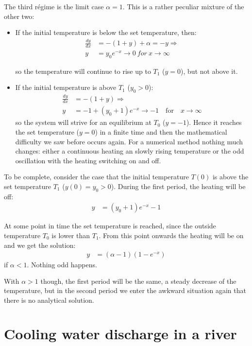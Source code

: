 \documentclass[onecolumn]{article}
\begin{document}
The third r\'egime is the limit case $\alpha = 1$. This is a rather peculiar mixture of the other two:
\begin{itemize}
\item
If the initial temperature is below the set temperature, then:
%
\begin{align}
    \frac{dy}{dx} &= -(1 + y) + \alpha = -y \Rightarrow \\
                y &= y_0 e^{-x} \rightarrow 0 ~for ~x \rightarrow \infty
\end{align}

\noindent so the temperature will continue to rise up to $T_1$ ($y = 0$), but not above it.
\item
If the initial temperature is above $T_1$ ($y_0 > 0$):
%
\begin{align}
    \frac{dy}{dx} &= -(1 + y)\Rightarrow \\
\nonumber       y &= -1 + (y_0 + 1) e^{-x} \rightarrow -1 \quad \text{for} \quad x \rightarrow \infty
\end{align}
\noindent so the system will strive for an equilibrium at $T_0$ ($y = -1$). Hence it reaches the
set temperature ($y = 0$) in a finite time and then the mathematical difficulty we saw before occurs
again. For a numerical method nothing much changes: either a continuous heating an slowly rising
temperature or the odd oscillation with the heating switching on and off.
\end{itemize}

To be complete, consider the case that the initial temperature $T(0)$ is above the set temperature $T_1$ ($y(0) = y_0 > 0$).
During the first period, the heating will be off:
%
\begin{align}
    y &= (y_0 + 1) e^{-x} - 1
\end{align}

At some point in time the set temperature is reached, since the outside temperature $T_0$ is lower than $T_1$.
From this point onwards the heating will be on and we get the solution:
%
\begin{align}
    y &= (\alpha - 1) (1 - e^{-x})
\end{align}
\noindent if $\alpha < 1$. Nothing odd happens.

With $\alpha > 1$ though, the first period will be the same, a steady decrease of the temperature,
but in the second period we enter the awkward situation again that there is no analytical solution.

\section*{Cooling water discharge in a river}
\end{document}

